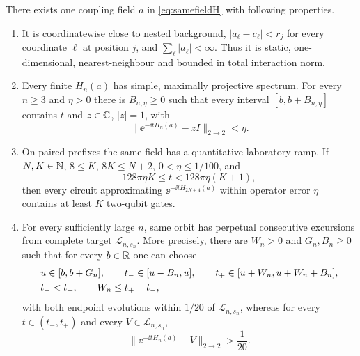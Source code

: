 \begin{theorem}
\label{thm:samefield}
There exists one coupling field $a$ in \eqref{eq:samefieldH} with following
properties.
\begin{enumerate}[leftmargin=1.7em]
\item It is coordinatewise close to nested background,
      $|a_\ell-c_\ell|<r_j$ for every coordinate $\ell$ at position $j$, and
      $\sum_\ell|a_\ell|<\infty$.  Thus it is static, one-dimensional,
      nearest-neighbour and bounded in total interaction norm.
\item Every finite $H_n(a)$ has simple, maximally projective spectrum.  For
      every $n\ge3$ and $\eta>0$ there is $B_{n,\eta}\ge0$ such that every
      interval $[b,b+B_{n,\eta}]$ contains $t$ and $z\in\mathbb C$, $|z|=1$, with
      \begin{equation}
       \|\ee^{-\ii tH_n(a)}-zI\|_{2\to2}<\eta .       \label{eq:samefieldrecurrence}
      \end{equation}
\item On paired prefixes the same field has a quantitative laboratory ramp.
      If $N,K\in\mathbb N$, $8\le K$, $8K\le N+2$, $0<\eta\le1/100$, and
      \begin{equation}
       128\pi\eta K\le t<128\pi\eta(K+1),             \label{eq:samefieldrampwindow}
      \end{equation}
      then every circuit approximating
      $\ee^{-\ii tH_{2N+4}(a)}$ within operator error $\eta$ contains at
      least $K$ two-qubit gates.
\item For every sufficiently large $n$, same orbit has perpetual consecutive
      excursions from complete target $\mathcal L_{n,s_n}$.  More precisely,
      there are $W_n>0$ and $G_n,B_n\ge0$ such that for every $b\in\mathbb R$ one
      can choose
      \begin{align}
       &u\in[b,b+G_n],\qquad
       t_-\in[u-B_n,u],\qquad
       t_+\in[u+W_n,u+W_n+B_n],                       \label{eq:samefieldtimes}\\
       &t_-<t_+,\qquad W_n\le t_+-t_-,                \notag
      \end{align}
      with both endpoint evolutions within $1/20$ of
      $\mathcal L_{n,s_n}$, whereas for every $t\in(t_-,t_+)$ and every
      $V\in\mathcal L_{n,s_n}$,
      \begin{equation}
       \|\ee^{-\ii tH_n(a)}-V\|_{2\to2}>\frac1{20}.   \label{eq:samefieldhard}
      \end{equation}

\end{enumerate}
\end{theorem}
